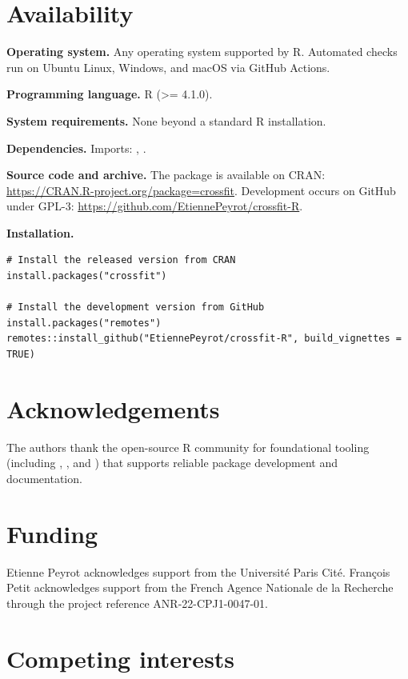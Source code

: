 \section*{Availability}\label{availability}

\textbf{Operating system.} Any operating system supported by R. Automated checks run on Ubuntu Linux, Windows, and macOS via GitHub Actions.

\textbf{Programming language.} R (\textgreater= 4.1.0).

\textbf{System requirements.} None beyond a standard R installation.

\textbf{Dependencies.} Imports: , .

\textbf{Source code and archive.} The  package is available on CRAN: \url{https://CRAN.R-project.org/package=crossfit}. Development occurs on GitHub under GPL-3: \url{https://github.com/EtiennePeyrot/crossfit-R}.

\textbf{Installation.}

\begin{verbatim}
# Install the released version from CRAN
install.packages("crossfit")

# Install the development version from GitHub
install.packages("remotes")
remotes::install_github("EtiennePeyrot/crossfit-R", build_vignettes = TRUE)
\end{verbatim}

\section*{Acknowledgements}\label{acknowledgements}

The authors thank the open-source R community for foundational tooling (including , , and ) that supports reliable package development and documentation.

\section*{Funding}\label{funding}

Etienne Peyrot acknowledges support from the Université Paris Cité. François Petit acknowledges support from the French Agence Nationale de la Recherche through the project reference ANR-22-CPJ1-0047-01.

\section*{Competing interests}\label{competing-interests}

